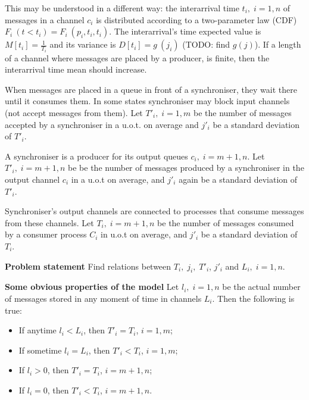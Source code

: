 This may be understood in a different way: the interarrival time $t_{i}, \; i=1,n$ of messages in a channel $c_{i}$ is distributed according to a two-parameter law (CDF) $F_{i} \: (t < t_{i}) = F_{i} \: (p_{i}, t_{i}, t_{i})$. The interarrival's time expected value is $M[t_{i}] = \frac{1}{T_{i}}$ and its variance is $D[t_{i}] = g \: (j_{i})$ (TODO: find $g(j)$). If a length of a channel where messages are placed by a producer, is finite, then the interarrival time mean should increase.

When messages are placed in a queue in front of a synchroniser, they wait there until it consumes them. In some states synchroniser may block input channels (not accept messages from them). Let $T'_{i}, \; i=1,m$ be the number of messages accepted by a synchroniser in a u.o.t. on average and $j'_{i}$ be a standard deviation of $T'_{i}$.

A synchroniser is a producer for its output queues $c_{i}, \; i=m+1,n$. Let $T'_{i}, \; i=m+1,n$ be be the number of messages produced by a synchroniser in the output channel $c_{i}$ in a u.o.t on average, and $j'_{i}$ again be a standard deviation of $T'_{i}$.

Synchroniser's output channels are connected to processes that consume messages from these channels. Let $T_{i}, \; i=m+1,n$ be the number of messages consumed by a consumer process $C_{i}$ in u.o.t on average, and $j'_{i}$ be a standard deviation of $T_{i}$.

\textbf{Problem statement} Find relations between $T_{i}, \; j_{i}, \; T'_{i}$, $j'_{i}$ and $L_{i}, \; i=1,n$.


\textbf{Some obvious properties of the model}
Let $l_{i}, \; i = 1,n$ be the actual number of messages stored in any moment of time in channels $L_{i}$. Then the following is true:
  \begin{itemize}
  \item If anytime $l_{i} < L_{i}$, then $T'_{i} = T_{i}$, $i = 1,m$;
  \item If sometime $l_{i} = L_{i}$, then $T'_{i} < T_{i}$, $i = 1,m$;
  \item If $l_{i} > 0$, then $T'_{i} = T_{i}$, $i = m+1,n$;
  \item If $l_{i} = 0$, then $T'_{i} < T_{i}$, $i = m+1,n$.
  \end{itemize}

